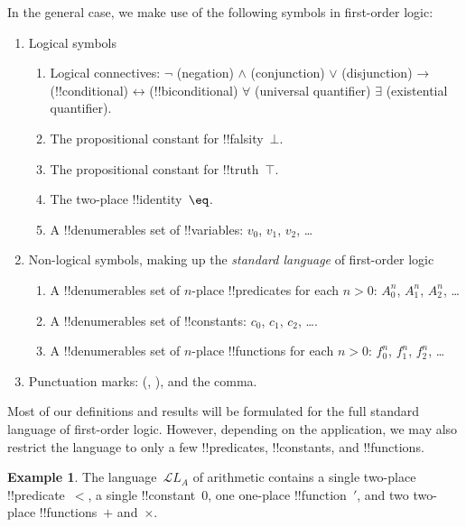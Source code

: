 \documentclass[10pt,a4paper]{article}
\makeatletter
\theoremstyle{plain}
\theoremstyle{definition}
\newtheorem{ex}[thm]{Example}
\theoremstyle{remark}
\providecommand{\lif}{\mathbin{\rightarrow}}
\providecommand{\lforall}{\mathord{\forall}}
\providecommand{\lexists}{\mathord{\exists}}
\providecommand{\ltrue}{\top}
\providecommand{\lfalse}{\bot}
\providecommand{\Obj}{}
\providecommand{\Lang}{\ensuremath{\mathcal{L}}}
\providecommand{\iftag}[1]{#1}
\providecommand{\tagitem}[1]{\item[#1]}
\providecommand{\liff}{\mathbin{\leftrightarrow}}
\providecommand{\iftag}{}
\def\iftag#1#2#3{\iftag@stop{#2}\iftag@more}
\def\iftag@more{\@ifnextchar\bgroup{\iftag@eat}{\relax}}
\def\iftag@eat#1{}
\def\iftag@stop#1{#1}
\makeatother
\begin{document}
In the general case, we make use of the following symbols in
first-order logic:

\begin{enumerate}
\item Logical symbols
\begin{enumerate}
\item Logical connectives:
  \startycommalist
  \iftag{prvNot}{\ycomma $\lnot$ (negation)}{}%
  \iftag{prvAnd}{\ycomma $\land$ (conjunction)}{}%
  \iftag{prvOr}{\ycomma $\lor$ (disjunction)}{}%
  \iftag{prvIf}{\ycomma $\lif$ (!!{conditional})}{}%
  \iftag{prvIff}{\ycomma $\liff$ (!!{biconditional})}{}%
  \iftag{prvAll}{\ycomma $\lforall$ (universal quantifier)}{}%
  \iftag{prvEx}{\ycomma $\lexists$ (existential quantifier)}{}.
\tagitem{prvFalse}{The propositional constant for !!{falsity}~$\lfalse$.}{}
\tagitem{prvTrue}{The propositional constant for !!{truth}~$\ltrue$.}{}
\item The two-place !!{identity}~$\eq$.
\item A !!{denumerable}s set of !!{variable}s: $\Obj v_0$, $\Obj v_1$, $\Obj
  v_2$, \dots
\end{enumerate}
\item Non-logical symbols, making up the \emph{standard
  language} of first-order logic
\begin{enumerate}
\item A !!{denumerable}s set of $n$-place !!{predicate}s for each $n>0$: $\Obj
  A^n_0$, $\Obj A^n_1$, $\Obj A^n_2$, \dots
\item A !!{denumerable}s set of !!{constant}s: $\Obj c_0$, $\Obj c_1$, $\Obj
  c_2$, \dots.
\item A !!{denumerable}s set of $n$-place !!{function}s for each $n>0$:
  $\Obj f^n_0$, $\Obj f^n_1$, $\Obj f^n_2$, \dots
\end{enumerate}
\item Punctuation marks: (, ), and the comma.
\end{enumerate}

Most of our definitions and results will be formulated for the full
standard language of first-order logic.  However, depending on the
application, we may also restrict the language to only a few
!!{predicate}s, !!{constant}s, and !!{function}s.

\begin{ex}
The language~$\Lang L_A$ of arithmetic contains a single two-place
!!{predicate}~$<$, a single !!{constant}~$\Obj 0$, one one-place
!!{function}~$\prime$, and two two-place !!{function}s~$+$ and~$\times$.
\end{ex}
\end{document}
